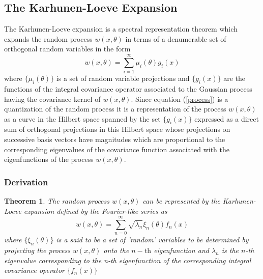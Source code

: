 \documentclass{article}
\newtheorem{theorem}{Theorem}
\begin{document}
\subsection{The Karhunen-Loeve Expansion}

The Karhunen-Loeve expansion is a spectral representation theorem which
expands the random process $w (x, \theta)$ in terms of a denumerable set of
orthogonal random variables in the form
\begin{equation}
w (x, \theta) = \sum_{i = 1}^{\infty} \mu_i (\theta) g_i (x) \label{process}
\end{equation}
where $\{\mu_i (\theta)\}$ is a set of random variable projections and $\{g_i
(x)\}$ are the functions of the integral covariance operator associated to the
Gaussian process having the covariance kernel of $w (x, \theta)$. Since
equation (\ref{process}) is a quantization of the random process it is a
representation of the process $w (x, \theta)$ as a curve in the Hilbert space
spanned by the set $\{g_i (x)\}$ expressed as a direct sum of orthogonal
projections in this Hilbert space whose projections on successive basis
vectors have magnitudes which are proportional to the corresponding
eigenvalues of the covariance function associated with the eigenfunctions of
the process $w (x, \theta)$.

\subsubsection{Derivation}

\begin{theorem}
The random process $w (x, \theta)$ can be represented by the Karhunen-Loeve
expansion defined by the Fourier-like series as
\begin{equation}
w (x, \theta) = \sum_{n = 0}^{\infty} \sqrt{\lambda_n} \xi_n (\theta) f_n
(x)
\end{equation}
where $\{\xi_n (\theta)\}$ is a said to be a set of 'random' variables to be
determined by projecting the process $w (x, \theta)$ onto the $n -
\mathrm{th}$ eigenfunction and $\lambda_n$ is the $n$-th eigenvalue
corresponding to the n-th eigenfunction of the corresponding integral
covariance operator $\{f_n (x)\}$
\end{theorem}
\end{document}
